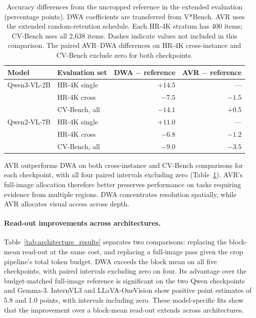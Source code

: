 \documentclass{article} %
\begin{document}
\begin{table}[tb]
\centering\small
\caption{Accuracy differences from the uncropped reference in the
extended evaluation (percentage points). DWA coefficients are
transferred from V*Bench. AVR uses the extended random-retention
schedule. Each HR-4K stratum has 400 items; CV-Bench uses all 2,638
items. Dashes indicate values not included in this comparison.
The paired AVR--DWA differences on HR-4K cross-instance and CV-Bench
exclude zero for both checkpoints.}
\label{tab:scope_results}
\begin{tabular}{llrr}
\toprule
Model & Evaluation set & DWA $-$ reference & AVR $-$ reference \\
\midrule
Qwen3-VL-2B & HR-4K single & $+14.5$ & --- \\
 & HR-4K cross & $-7.5$ & $-1.5$ \\
 & CV-Bench, all & $-14.1$ & $+0.5$ \\
\midrule
Qwen2-VL-7B & HR-4K single & $+11.0$ & --- \\
 & HR-4K cross & $-6.8$ & $-1.2$ \\
 & CV-Bench, all & $-9.0$ & $-3.5$ \\
\bottomrule
\end{tabular}
\end{table}

AVR outperforms DWA on both cross-instance and CV-Bench comparisons
for each checkpoint, with all four paired intervals excluding zero
(Table~\ref{tab:scope_results}). AVR's full-image allocation therefore better preserves performance
on tasks requiring evidence from multiple regions. DWA concentrates resolution
spatially, while AVR allocates visual access across depth.

\paragraph{Read-out improvements across architectures.}

Table~\ref{tab:architecture_results} separates two comparisons:
replacing the block-mean read-out at the same cost, and replacing a
full-image pass given the crop pipeline's total token budget.
DWA exceeds the block mean on all five checkpoints, with paired
intervals excluding zero on four. Its advantage over the
budget-matched full-image reference is significant on the two Qwen
checkpoints and Gemma-3. InternVL3 and LLaVA-OneVision show positive
point estimates of 5.8 and 1.0 points, with intervals including zero.
These model-specific fits show that the improvement over a block-mean
read-out extends across architectures.
\end{document}
